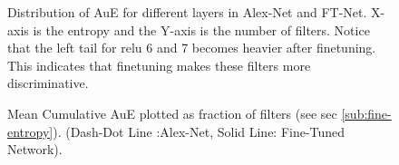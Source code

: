 \documentclass[runningheads]{llncs}
\begin{document}
\begin{figure}[t!]
\centering
{}
\caption{Distribution of AuE for different layers in Alex-Net and FT-Net. X-axis is the entropy and the Y-axis is the number of filters. Notice that the left tail for relu 6 and 7 becomes heavier after finetuning. This indicates that finetuning makes these filters more discriminative.}
\label{fig:fine-hist}
\end{figure}

\begin{figure}[t!]
\centering
{}
\caption{Mean Cumulative AuE plotted as fraction of filters (see sec \ref{sub:fine-entropy}). (Dash-Dot Line :Alex-Net, Solid Line: Fine-Tuned Network).}
\label{fig:fine-entropy}
\end{figure}
\end{document}
